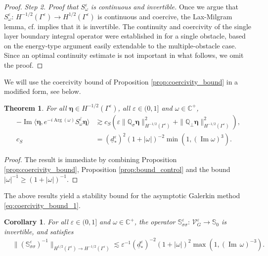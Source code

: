 \documentclass[]{article}
\newtheorem{theorem}{Theorem}
\newtheorem{corollary}{Corollary}
\numberwithin{equation}{section}
\numberwithin{theorem}{section}
\numberwithin{lemma}{section}
\numberwithin{corollary}{section}
\numberwithin{proposition}{section}
\numberwithin{definition}{section}
\newcommand{\mypar}[1]{\noindent\textit{#1}\hspace{0.1em}}
\newcommand{\re}{\varepsilon}
\renewcommand{\vec}{\boldsymbol}
\renewcommand{\Im}{\operatorname{Im}}
\begin{document}
\begin{proof}
		
		
		\mypar{Step 2. Proof that $S^{\re}_{\omega}$ is continuous and invertible. }
		Once we argue that $S^{\re}_{\omega}: \, H^{-1/2}(\Gamma^{\re})\rightarrow H^{1/2}(\Gamma^{\re})$ is continuous and coercive, the Lax-Milgram lemma, cf. \cite[Lemma 2.32]{mclean} implies that it is invertible. 
		The continuity and coercivity of the single layer boundary integral operator were established in \cite{bamberger_ha_duong} for a single obstacle, based on the energy-type argument easily extendable to the multiple-obstacle case. Since an optimal continuity estimate is not important in what follows, we omit the proof.
	\end{proof}
	We will use the coercivity bound of Proposition \ref{prop:coercivity_bound} in a modified form, see below.
	\begin{theorem}
		\label{theorem:coercivity_bound_principal}
		For all $\vec{\eta} \in H^{-1/2}(\Gamma^{\re})$, all $\re \in (0,1]$ and $\omega\in \mathbb{C}^+$,
		\begin{align*}%
			-\Im \langle {\vec{\vec{\eta}}},e^{-i \operatorname{Arg}(\omega)} \overline{  S^{\re}_{\omega} \vec{\vec{\eta}}}\rangle &\gtrsim  c_S \left(\re \| \mathbb{Q}_{\sigma}\vec{\eta} \|^2_{H^{-1/2}(\Gamma^{\re})} +  \|  \mathbb{Q}_{\perp}\vec{\eta} \|^2_{H^{-1/2}(\Gamma^{\re})} \right),\\
			c_S&=(\underline{d}^{\re}_*)^{2} (1+|\omega|)^{-2} \min(1, (\Im \omega)^3).
		\end{align*}
	\end{theorem} 
	\begin{proof}
		The result is immediate by combining Proposition \ref{prop:coercivity_bound}, Proposition \ref{prop:bound_control} and the bound  $|\omega|^{-1}\geq (1+|\omega|)^{-1}$. 
	\end{proof}
	The above results yield a stability bound for the asymptotic Galerkin method \eqref{eq:coercivity_bound_1}.
	\begin{corollary}
		\label{corollary:stability_bound}
		For all $\re\in (0,1]$ and $\omega \in \mathbb{C}^+$, the operator $\mathbb{S}^{\re}_{\sigma\sigma}: \, \mathcal{V}^{\re}_G\rightarrow \mathbb{S}_0$ is invertible, and satisfies
		\begin{align*}%
			&\| (\mathbb{S}^{\re}_{\sigma \sigma})^{-1} \|_{H^{1/2}(\Gamma^{\re})\rightarrow H^{-1/2}(\Gamma^{\re})} \lesssim \re^{-1}  (\underline{d}^{\re}_{*})^{-2} (1+  |\omega|  )^2 \max(1, (\Im \, \omega)^{-3}).
		\end{align*}
	\end{corollary}
\end{document}
